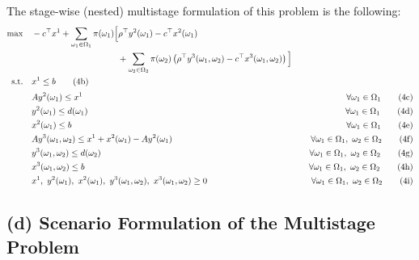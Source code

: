 \documentclass[8pt]{article}
\begin{document}
\bigskip
\noindent
The stage-wise (nested) multistage formulation of this problem is the following:
\begin{subequations}
    \begin{align}
        \max \quad
         & -c^\top x^1
        + \sum_{\omega_1 \in \Omega_1} \pi(\omega_1)
        \Big[ \rho^\top y^2(\omega_1) - c^\top x^2(\omega_1)                                              \\
         & \quad\quad\quad\quad\quad\quad\quad\quad\quad\quad + \sum_{\omega_2 \in \Omega_2} \pi(\omega_2)
        \left( \rho^\top y^3(\omega_1, \omega_2) - c^\top x^3(\omega_1, \omega_2) \right) \Big] \notag    \\
        \text{s.t.} \quad
         & x^1 \leq b \tag{4b}                                                                            \\[0.2em]
         & A y^2(\omega_1) \leq x^1
         & \quad \forall \omega_1 \in \Omega_1 \tag{4c}                                                   \\
         & y^2(\omega_1) \leq d(\omega_1)
         & \quad \forall \omega_1 \in \Omega_1 \tag{4d}                                                   \\
         & x^2(\omega_1) \leq b
         & \quad \forall \omega_1 \in \Omega_1 \tag{4e}                                                   \\
         & A y^3(\omega_1, \omega_2) \leq x^1 + x^2(\omega_1) - A y^2(\omega_1)
         & \quad \forall \omega_1 \in \Omega_1,\ \omega_2 \in \Omega_2 \tag{4f}                           \\
         & y^3(\omega_1, \omega_2) \leq d(\omega_2)
         & \quad \forall \omega_1 \in \Omega_1,\ \omega_2 \in \Omega_2 \tag{4g}                           \\
         & x^3(\omega_1, \omega_2) \leq b
         & \quad \forall \omega_1 \in \Omega_1,\ \omega_2 \in \Omega_2 \tag{4h}                           \\
         & x^1,\ y^2(\omega_1),\ x^2(\omega_1),\ y^3(\omega_1, \omega_2),\ x^3(\omega_1, \omega_2) \geq 0
         & \quad \forall \omega_1 \in \Omega_1,\ \omega_2 \in \Omega_2 \tag{4i}
    \end{align}
\end{subequations}

\subsection*{(d) Scenario Formulation of the Multistage Problem}
\end{document}
